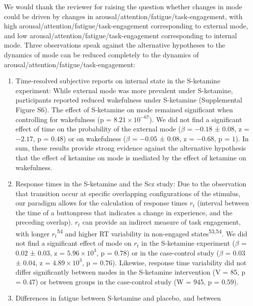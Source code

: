 \documentclass[
]{article}
\begin{document}
We would thank the reviewer for raising the question whether changes in
mode could be driven by changes in
arousal/attention/fatigue/task-engagement, with high
arousal/attention/fatigue/task-engagement corresponding to external
mode, and low arousal/attention/fatigue/task-engagement corresponding to
internal mode. Three observations speak against the alternative
hypotheses to the dynamics of mode can be reduced completely to the
dynamics of arousal/attention/fatigue/task-engagement:

\begin{enumerate}
\def\labelenumi{(\roman{enumi})}
\item
  Time-resolved subjective reports on internal state in the S-ketamine
  experiment: While external mode was more prevalent under S-ketamine,
  participants reported reduced wakefulness under S-ketamine
  (Supplemental Figure S6). The effect of S-ketamine on mode remained
  significant when controlling for wakefulness (p =
  \(\ensuremath{8.21\times 10^{-67}}\)). We did not find a significant
  effect of time on the probability of the external mode (\(\beta\) =
  \(-0.18\) ± \(0.08\), z = \(-2.17\), p = \(0.48\)) or on wakefulness
  (\(\beta\) = \(-0.05\) ± \(0.08\), z = \(-0.68\), p = \(1\)). In sum,
  these results provide strong evidence against the alternative
  hypothesis that the effect of ketamine on mode is mediated by the
  effect of ketamine on wakefulness.
\item
  Response times in the S-ketamine and the Scz study: Due to the
  observation that transition occur at specific overlapping
  configurations of the stimulus, our paradigm allows for the
  calculation of response times \(r_t\) (interval between the time of a
  buttonpress that indicates a change in experience, and the preceding
  overlap). \(r_t\) can provide an indirect measure of task engagement,
  with longer \(r_t\)\textsuperscript{54} and higher RT variability in
  non-engaged states\textsuperscript{53,54}. We did not find a
  significant effect of mode on \(r_t\) in the S-ketamine experiment
  (\(\beta\) = \(0.02\) ± \(0.03\), z =
  \(\ensuremath{5.96\times 10^{3}}\), p = \(0.78\)) or in the
  case-control study (\(\beta\) = \(0.03\) ± \(0.04\), z =
  \(\ensuremath{4.89\times 10^{3}}\), p = \(0.76\)). Likewise, response
  time variability did not differ significantly between modes in the
  S-ketamine intervention (V = 85, p = 0.47) or between groups in the
  case-control study (W = 945, p = 0.59).
\item
  Differences in fatigue between S-ketamine and placebo, and between

\end{enumerate}
\end{document}
